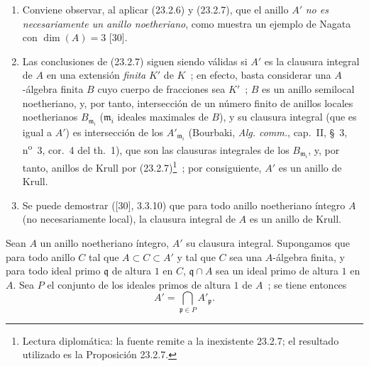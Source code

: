 \begin{remarks}[23.2.8]
\label{0.23.2.8-es}
\begin{enumerate}
  \item[(i)] Conviene observar, al aplicar (23.2.6) y
  (23.2.7), que el anillo $A'$ \emph{no es necesariamente un anillo
  noetheriano}, como muestra un ejemplo de Nagata con $\dim(A)=3$ [30].

  \item[(ii)] Las conclusiones de (23.2.7) siguen siendo válidas si $A'$ es
  la clausura integral de $A$ en una extensión \emph{finita} $K'$ de $K$~; en efecto,
  basta considerar una $A$-álgebra finita $B$ cuyo cuerpo de fracciones sea
  $K'$~; $B$ es un anillo semilocal noetheriano, y, por tanto,
  intersección de un número finito de anillos locales noetherianos
  $B_{\mathfrak m_i}$ ($\mathfrak m_i$ ideales maximales de $B$), y su clausura
  integral (que es igual a $A'$) es intersección de los
  $A'_{\mathfrak m_i}$ (Bourbaki, \emph{Alg. comm.}, cap.~II, §~3,
  n\textsuperscript{o}~3, cor.~4 del th.~1), que son las clausuras integrales
  de los $B_{\mathfrak m_i}$, y, por tanto, anillos de Krull por (23.2.7)\footnote{Lectura diplomática: la fuente remite a la inexistente 23.2.7; el resultado utilizado es la Proposición 23.2.7.}~; por
  consiguiente, $A'$ es un anillo de Krull.

  \item[(iii)] Se puede demostrar ([30], 3.3.10) que para todo anillo noetheriano
  íntegro $A$ (no necesariamente local), la clausura integral de $A$ es un
  anillo de Krull.
\end{enumerate}
\end{remarks}

\begin{corollary}[23.2.9]
\label{0.23.2.9-es}
Sean $A$ un anillo noetheriano íntegro, $A'$ su clausura integral. Supongamos
que para todo anillo $C$ tal que $A\subset C\subset A'$ y tal que $C$ sea
una $A$-álgebra finita, y para todo ideal primo $\mathfrak q$ de altura $1$
en $C$, $\mathfrak q\cap A$ sea un ideal primo de altura $1$ en $A$.
Sea $P$ el conjunto de los ideales primos de altura $1$ de $A$~; se tiene entonces
\[
  A'=\bigcap_{\mathfrak p\in P}A'_{\mathfrak p}.
\]
\end{corollary}

